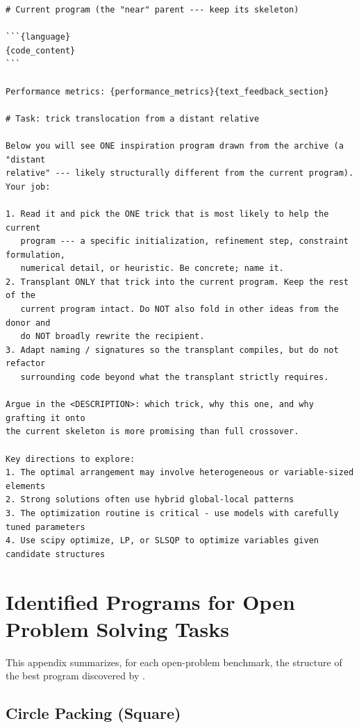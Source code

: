 \begin{ttcolorbox}
\begin{lstlisting}[style=prompt]
# Current program (the "near" parent --- keep its skeleton)

```{language}
{code_content}
```

Performance metrics: {performance_metrics}{text_feedback_section}

# Task: trick translocation from a distant relative

Below you will see ONE inspiration program drawn from the archive (a "distant
relative" --- likely structurally different from the current program). Your job:

1. Read it and pick the ONE trick that is most likely to help the current
   program --- a specific initialization, refinement step, constraint formulation,
   numerical detail, or heuristic. Be concrete; name it.
2. Transplant ONLY that trick into the current program. Keep the rest of the
   current program intact. Do NOT also fold in other ideas from the donor and
   do NOT broadly rewrite the recipient.
3. Adapt naming / signatures so the transplant compiles, but do not refactor
   surrounding code beyond what the transplant strictly requires.

Argue in the <DESCRIPTION>: which trick, why this one, and why grafting it onto
the current skeleton is more promising than full crossover.

Key directions to explore:
1. The optimal arrangement may involve heterogeneous or variable-sized elements
2. Strong solutions often use hybrid global-local patterns
3. The optimization routine is critical - use models with carefully tuned parameters
4. Use scipy optimize, LP, or SLSQP to optimize variables given candidate structures
\end{lstlisting}
\end{ttcolorbox}




\section{Identified Programs for Open Problem Solving Tasks}
\label{app:program}

This appendix summarizes, for each open-problem benchmark, the structure of
the best program discovered by \ours{}.

\subsection{Circle Packing (Square)}
\label{app:program:cp}

